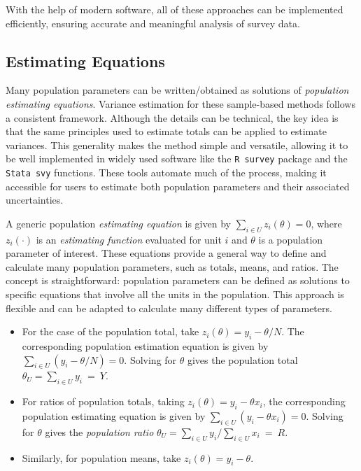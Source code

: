 \documentclass[
  12pt,
]{book}
\begin{document}
With the help of modern software, all of these approaches can be implemented efficiently, ensuring accurate and meaningful analysis of survey data.

\hypertarget{estimating-equations}{%
\subsection{Estimating Equations}\label{estimating-equations}}

Many population parameters can be written/obtained as solutions of \emph{population estimating equations}. Variance estimation for these sample-based methods follows a consistent framework. Although the details can be technical, the key idea is that the same principles used to estimate totals can be applied to estimate variances. This generality makes the method simple and versatile, allowing it to be well implemented in widely used software like the \texttt{R\ survey} package and the \texttt{Stata\ svy} functions. These tools automate much of the process, making it accessible for users to estimate both population parameters and their associated uncertainties.

A generic population \emph{estimating equation} is given by \(\sum_{i \in U} z_i (\theta) = 0\), where \(z_i(\cdot)\) is an \emph{estimating function} evaluated for unit \(i\) and \(\theta\) is a population parameter of interest. These equations provide a general way to define and calculate many population parameters, such as totals, means, and ratios. The concept is straightforward: population parameters can be defined as solutions to specific equations that involve all the units in the population. This approach is flexible and can be adapted to calculate many different types of parameters.

\begin{itemize}
\item
  For the case of the population total, take \(z_i(\theta) = y_i - \theta / N\). The corresponding population estimation equation is given by \(\sum _{i \in U} (y_i - \theta / N) = 0\). Solving for \(\theta\) gives the population total \(\theta_U = \sum _{i \in U} y_i \ = \ Y\).
\item
  For ratios of population totals, taking \(z_i(\theta) = y_i - \theta x_i\), the corresponding population estimating equation is given by \(\sum _{i \in U} (y_i - \theta x_i) = 0\). Solving for \(\theta\) gives the \emph{population ratio} \(\theta_U = \sum _{i \in U} y_i / \sum _{i \in U} x_i \ = \ R\).
\item
  Similarly, for population means, take \(z_i(\theta) = y_i - \theta\).
\end{itemize}
\end{document}
